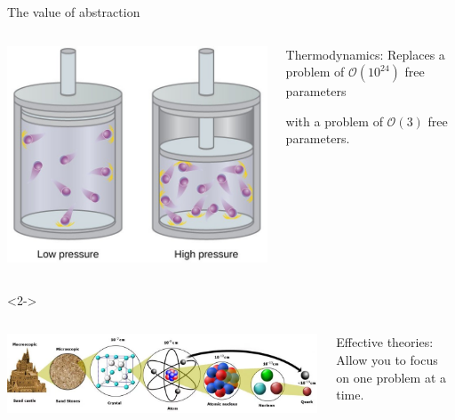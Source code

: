 \documentclass[aspectratio=169]{beamer}
\begin{document}
\begin{frame}{The value of abstraction}
\large
\vspace{0.5 cm}
\begin{columns}
\includegraphics[width=\linewidth]{idealgas.jpg}

\begin{block}{\LARGE Thermodynamics:}
\vspace{0.1 cm}
Replaces a problem of $\mathcal{O}(10^{24})$ free parameters

\vspace{0.1 cm}
with a problem of $\mathcal{O}(3)$ free parameters.
\end{block}
\end{columns}

\vspace{0.8 cm}
\begin{uncoverenv}<2->
\begin{columns}
\includegraphics[width=\linewidth]{atom-proton-quark.png}

\begin{block}{\LARGE Effective theories:}
\vspace{0.1 cm}
Allow you to focus on one problem at a time.
\end{block}
\end{columns}
\end{uncoverenv}
\end{frame}
\end{document}
